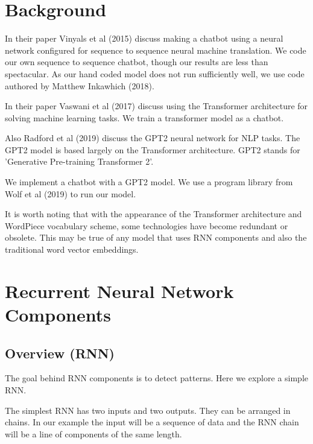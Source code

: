 

\section{Background}

In their paper Vinyals et al (2015)\cite{DBLP:journals/corr/VinyalsL15} discuss making a chatbot using
a neural network configured for sequence to sequence neural machine
translation. We code our own sequence to sequence chatbot, though our results are less than
spectacular. As our hand coded model does not run sufficiently well, we use code authored by Matthew Inkawhich (2018)\cite{2018Inkawhich}.

In their paper Vaswani et al (2017)\cite{Vaswani2017AttentionIA} discuss using the Transformer architecture for solving machine learning tasks. We train a transformer model as a chatbot.


Also Radford et al (2019)\cite{radford2019language} discuss the GPT2 neural network for NLP tasks. The GPT2 model is based largely on the Transformer architecture. GPT2 stands for 'Generative Pre-training Transformer 2'. 

We implement a chatbot with a GPT2 model. We use a program library from Wolf et al (2019)\cite{Wolf2019HuggingFacesTS} to run our model.


It is worth noting that with the appearance of the Transformer architecture and WordPiece vocabulary scheme, some technologies have become redundant or obsolete. This may be true of any model that uses RNN components and also the traditional word vector embeddings.

\section{Recurrent Neural Network Components}

\subsection*{Overview (RNN)}
The goal behind RNN components is to detect patterns. Here we explore a simple \ac{RNN}.

The simplest RNN has two inputs and two outputs. They can be arranged in chains. In our example the input will be a sequence of data and the RNN chain will be a line of components of the same length.

